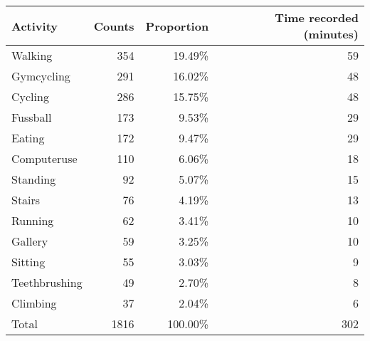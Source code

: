 \begin{tabular}{lrrr}
\toprule
      Activity &  Counts &  Proportion &  Time recorded (minutes) \\
\midrule
       Walking &     354 &      19.49\% &                       59 \\
    Gymcycling &     291 &      16.02\% &                       48 \\
       Cycling &     286 &      15.75\% &                       48 \\
      Fussball &     173 &       9.53\% &                       29 \\
        Eating &     172 &       9.47\% &                       29 \\
   Computeruse &     110 &       6.06\% &                       18 \\
      Standing &      92 &       5.07\% &                       15 \\
        Stairs &      76 &       4.19\% &                       13 \\
       Running &      62 &       3.41\% &                       10 \\
       Gallery &      59 &       3.25\% &                       10 \\
       Sitting &      55 &       3.03\% &                        9 \\
 Teethbrushing &      49 &       2.70\% &                        8 \\
      Climbing &      37 &       2.04\% &                        6 \\
         Total &    1816 &     100.00\% &                      302 \\
\bottomrule
\end{tabular}
